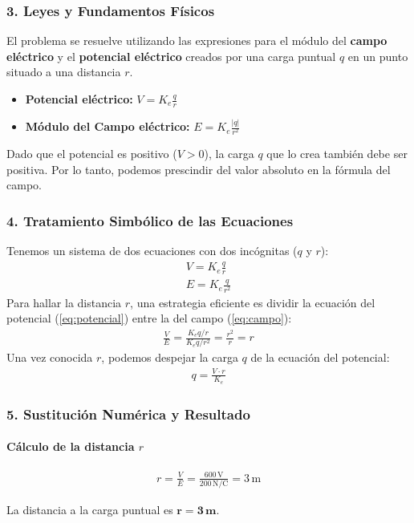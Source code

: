 \subsubsection*{3. Leyes y Fundamentos Físicos}
El problema se resuelve utilizando las expresiones para el módulo del \textbf{campo eléctrico} y el \textbf{potencial eléctrico} creados por una carga puntual $q$ en un punto situado a una distancia $r$.
\begin{itemize}
    \item \textbf{Potencial eléctrico:} $V = K_e \frac{q}{r}$
    \item \textbf{Módulo del Campo eléctrico:} $E = K_e \frac{|q|}{r^2}$
\end{itemize}
Dado que el potencial es positivo ($V>0$), la carga $q$ que lo crea también debe ser positiva. Por lo tanto, podemos prescindir del valor absoluto en la fórmula del campo.

\subsubsection*{4. Tratamiento Simbólico de las Ecuaciones}
Tenemos un sistema de dos ecuaciones con dos incógnitas ($q$ y $r$):
\begin{gather}
    V = K_e \frac{q}{r} \label{eq:potencial} \\
    E = K_e \frac{q}{r^2} \label{eq:campo}
\end{gather}
Para hallar la distancia $r$, una estrategia eficiente es dividir la ecuación del potencial (\ref{eq:potencial}) entre la del campo (\ref{eq:campo}):
\begin{gather}
    \frac{V}{E} = \frac{K_e q/r}{K_e q/r^2} = \frac{r^2}{r} = r
\end{gather}
Una vez conocida $r$, podemos despejar la carga $q$ de la ecuación del potencial:
\begin{gather}
    q = \frac{V \cdot r}{K_e}
\end{gather}

\subsubsection*{5. Sustitución Numérica y Resultado}
\paragraph*{Cálculo de la distancia $r$}
\begin{gather}
    r = \frac{V}{E} = \frac{600 \, \text{V}}{200 \, \text{N/C}} = 3 \, \text{m}
\end{gather}
\begin{cajaresultado}
    La distancia a la carga puntual es $\boldsymbol{r = 3 \, \textbf{m}}$.
\end{cajaresultado}

